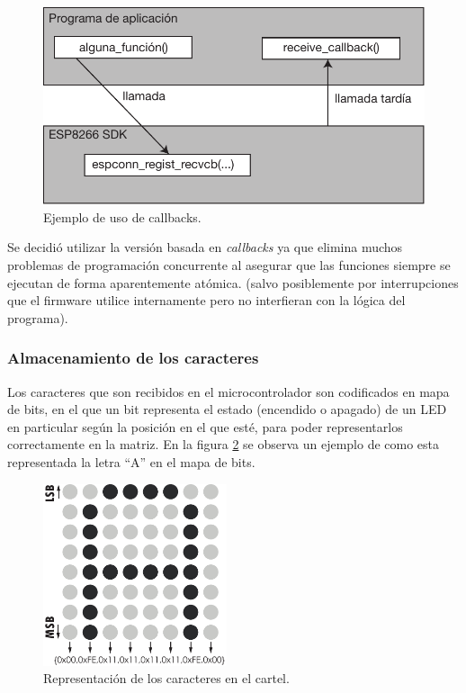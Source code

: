 \begin{figure}[ht!]
	\begin{center}
		\centering
		\includegraphics[scale=0.8]{imagenes/callbacks.pdf}
		\caption{Ejemplo de uso de callbacks.}
		\label{fig:callbacks}
	\end{center}
\end{figure}

Se decidió utilizar la versión basada en \emph{callbacks} ya que elimina muchos problemas de programación concurrente al asegurar que las funciones siempre se ejecutan de forma aparentemente atómica. (salvo posiblemente por interrupciones que el firmware utilice internamente pero no interfieran con la lógica del programa).

\subsubsection{Almacenamiento de los caracteres}

Los caracteres que son recibidos en el microcontrolador son codificados en mapa de bits, en el que un bit representa el estado (encendido o apagado) de un LED en particular según la posición en el que esté, para poder representarlos correctamente en la matriz. En la figura \ref{fig:repAscii} se observa un ejemplo de como esta representada la letra \enquote{A} en el mapa de bits.

\begin{figure}[h!]
    \centering
    \includegraphics[width=0.48\textwidth]{imagenes/codificacionAscii.pdf}
    \caption{Representación de los caracteres en el cartel.}
    \label{fig:repAscii}
\end{figure}


